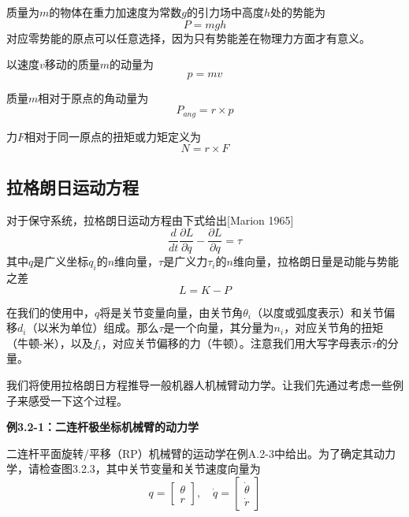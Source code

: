 \documentclass[12pt,a4paper]{ctexart}
\begin{document}
质量为$m$的物体在重力加速度为常数$g$的引力场中高度$h$处的势能为
\begin{equation}
P = mgh
\end{equation}
对应零势能的原点可以任意选择，因为只有势能差在物理力方面才有意义。

以速度$v$移动的质量$m$的动量为
\begin{equation}
p = mv
\end{equation}

质量$m$相对于原点的角动量为
\begin{equation}
P_{ang} = r \times p
\end{equation}

力$F$相对于同一原点的扭矩或力矩定义为
\begin{equation}
N = r \times F
\end{equation}

\subsection{拉格朗日运动方程}

对于保守系统，拉格朗日运动方程由下式给出[Marion 1965]
\begin{equation}
\frac{d}{dt}\frac{\partial L}{\partial \dot{q}} - \frac{\partial L}{\partial q} = \tau
\end{equation}
其中$q$是广义坐标$q_i$的$n$维向量，$\tau$是广义力$\tau_i$的$n$维向量，拉格朗日量是动能与势能之差
\begin{equation}
L = K - P
\end{equation}

在我们的使用中，$q$将是关节变量向量，由关节角$\theta_i$（以度或弧度表示）和关节偏移$d_i$（以米为单位）组成。那么$\tau$是一个向量，其分量为$n_i$，对应关节角的扭矩（牛顿-米），以及$f_i$，对应关节偏移的力（牛顿）。注意我们用大写字母表示$\tau$的分量。

我们将使用拉格朗日方程推导一般机器人机械臂动力学。让我们先通过考虑一些例子来感受一下这个过程。

\textbf{例3.2-1：二连杆极坐标机械臂的动力学}

二连杆平面旋转/平移（RP）机械臂的运动学在例A.2-3中给出。为了确定其动力学，请检查图3.2.3，其中关节变量和关节速度向量为
\begin{equation}
q = \begin{bmatrix} \theta \\ r \end{bmatrix}, \quad \dot{q} = \begin{bmatrix} \dot{\theta} \\ \dot{r} \end{bmatrix}
\end{equation}
\end{document}
